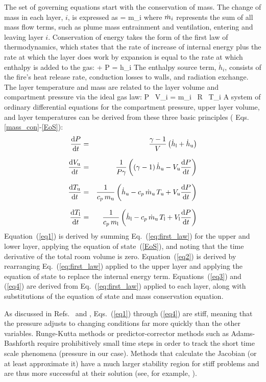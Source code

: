 \documentclass[12pt]{book}
\begin{document}
The set of governing equations start with the conservation of mass. The change of mass in each layer, $i$, is expressed as
\be
    = \dot m_i  \label{mass_con}
\ee
where $\dot{m}_i$ represents the sum of all mass flow terms, such as plume mass entrainment and ventilation, entering and leaving layer $i$. Conservation of energy takes the form of the first law of thermodynamics, which states that the rate of increase of internal energy plus the rate at which the layer does work by expansion is equal to the rate at which enthalpy is added to the gas:
\be
    +  P  =  \dot h_i \label{eq:first_law}
\ee
The enthalpy source term, $\dot h_i$, consists of the fire's heat release rate, conduction losses to walls, and radiation exchange. The layer temperature and mass are related to the layer volume and compartment pressure via the ideal gas law:
\be
  P \, V_i = m_i \, R \, T_i \label{EoS}
\ee
A system of ordinary differential equations for the compartment pressure, upper layer volume, and layer temperatures can be derived from these three basic principles ( Eqs. \ref{mass_con}-\ref{EoS}):
\begin{eqnarray}
\frac{\mathrm{d} {P}}{\mathrm{d} t} &=& \frac{{\gamma-1}}{{V}} \left( \dot{h}_{\rm l} + \dot{h}_{\rm u} \right)  \label{eq1} \\[.1in]
\frac{\mathrm{d} {V_{\rm u}}}{\mathrm{d} t} &=& \frac{1}{P \gamma} \left( (\gamma-1) \, \dot{h}_{\rm u} - V_{\rm u} \frac{\mathrm{d} {P}}{\mathrm{d} t} \right) \label{eq2} \\[.1in]
\frac{\mathrm{d} {T_{\rm u}}}{\mathrm{d} t} &=& \frac{1}{c_p \, m_{\rm u}} \left( \dot{h}_{\rm u} - c_p \, \dot{m}_{\rm u} \, T_{\rm u} + V_{\rm u} \frac{\mathrm{d} {P}}{\mathrm{d} t} \right) \label{eq3} \\[.1in]
\frac{\mathrm{d} {T_{\rm l}}}{\mathrm{d} t} &=& \frac{1}{c_p \, m_{\rm l}} \left( \dot{h}_{\rm l} - c_p \, \dot{m}_{\rm u} \, T_{\rm l} + V_{\rm l} \frac{\mathrm{d} {P}}{\mathrm{d} t} \right) \label{eq4}
\end{eqnarray}
Equation~(\ref{eq1}) is derived by summing Eq.~(\ref{eq:first_law}) for the upper and lower layer, applying the equation of state~(\ref{EoS}), and noting that the time derivative of the total room volume is zero. Equation~(\ref{eq2}) is derived by rearranging Eq.~(\ref{eq:first_law}) applied to the upper layer and applying the equation of state to replace the internal energy term. Equations~(\ref{eq3}) and (\ref{eq4}) are derived from Eq.~(\ref{eq:first_law}) applied to each layer, along with substitutions of the equation of state and mass conservation equation.

As discussed in Refs.~\cite{Forney:1994} and \cite{Rehm:1992}, Eqs.~(\ref{eq1}) through (\ref{eq4}) are stiff, meaning that the pressure adjusts to changing conditions far more quickly than the other variables. Runge-Kutta methods or predictor-corrector methods such as Adams-Bashforth require prohibitively small time steps in order to track the short time scale phenomena (pressure in our case). Methods that calculate the Jacobian (or at least approximate it) have a much larger stability region for stiff problems and are thus more successful at their solution (see, for example, \cite{Numerical_Recipes}).
\end{document}

